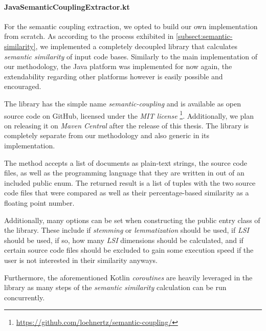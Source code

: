 \documentclass[12pt,a4paper]{report}
\begin{document}
\paragraph{JavaSemanticCouplingExtractor.kt}
For the semantic coupling extraction, we opted to build our own implementation
from scratch. As according to the process exhibited in \ref{subsect:semantic-similarity},
we implemented a completely decoupled library that calculates \textit{semantic similarity}
of input code bases. Similarly to the main implementation of our methodology,
the Java platform was implemented for now again, the extendability regarding other
platforms however is easily possible and encouraged.

The library has the simple name \textit{semantic-coupling} and is available as
open source code on GitHub, licensed under the \textit{MIT license}
\footnote{\url{https://github.com/loehnertz/semantic-coupling/}}.
Additionally, we plan on releasing it on \textit{Maven Central} after the release
of this thesis. The library is completely separate from our methodology and
also generic in its implementation.

The  method accepts a list of documents as plain-text strings,
the source code files, as well as the programming language that they are written in
out of an included public enum.
The returned result is a list of tuples with the two source code files that were compared
as well as their percentage-based similarity as a floating point number.

Additionally, many options can be set when constructing the public entry class
of the library. These include if \textit{stemming} or \textit{lemmatization} should be used,
if \textit{LSI} should be used, if so, how many \textit{LSI} dimensions should be calculated,
and if certain source code files should be excluded to gain some execution speed if the user
is not interested in their similarity anyways.

Furthermore, the aforementioned Kotlin \textit{coroutines} are heavily leveraged in
the library as many steps of the \textit{semantic similarity} calculation can be
run concurrently.
\end{document}
